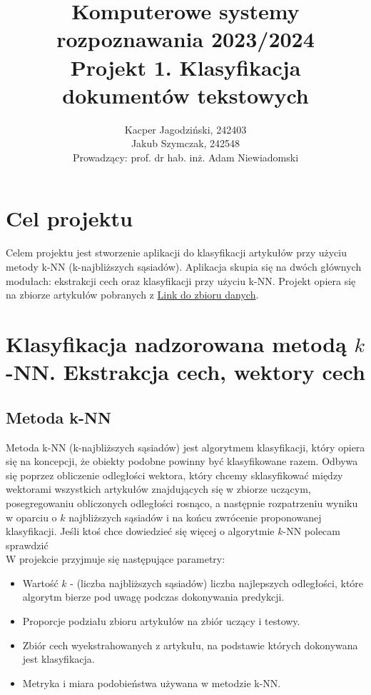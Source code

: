 \documentclass{article}
\author{
	{Kacper Jagodziński, 242403} \\
	{Jakub Szymczak, 242548}\\ 
{Prowadzący: prof. dr hab. inż. Adam Niewiadomski}
}
\title{Komputerowe systemy rozpoznawania 2023/2024\\Projekt 1. Klasyfikacja dokumentów tekstowych}
\begin{document}
\maketitle


\section{Cel projektu}
Celem projektu jest stworzenie aplikacji do klasyfikacji artykułów przy użyciu metody k-NN (k-najbliższych sąsiadów). Aplikacja skupia się na dwóch głównych modułach: ekstrakcji cech oraz klasyfikacji przy użyciu k-NN. Projekt opiera się na zbiorze artykułów pobranych z \href{https://archive.ics.uci.edu/dataset/137/reuters+21578+text+categorization+collection}{Link do zbioru danych}.


\section{Klasyfikacja nadzorowana metodą $k$-NN.  Ekstrakcja cech, wektory cech}

\subsection{Metoda k-NN}

Metoda k-NN (k-najbliższych sąsiadów) jest algorytmem klasyfikacji, który opiera się na koncepcji, że obiekty podobne powinny być klasyfikowane razem. Odbywa się poprzez obliczenie odległości wektora, który chcemy sklasyfikować między wektorami wszystkich artykułów znajdujących się w zbiorze uczącym, posegregowaniu obliczonych odległości rosnąco, a następnie rozpatrzeniu wyniku w oparciu o $k$ najbliższych sąsiadów i na końcu zwrócenie proponowanej klasyfikacji. Jeśli ktoś chce dowiedzieć się więcej o algorytmie $k$-NN polecam sprawdzić \cite{introduction-machine-learning}\\
\indent W projekcie przyjmuje się następujące parametry:

\begin{itemize}
    \item Wartość $k$ - (liczba najbliższych sąsiadów) liczba najlepszych odległości, które algorytm bierze pod uwagę podczas dokonywania predykcji.
    \item Proporcje podziału zbioru artykułów na zbiór uczący i testowy.
    \item Zbiór cech wyekstrahowanych z artykułu, na podstawie których dokonywana jest klasyfikacja.
    \item Metryka i miara podobieństwa używana w metodzie k-NN.
\end{itemize}
\end{document}
